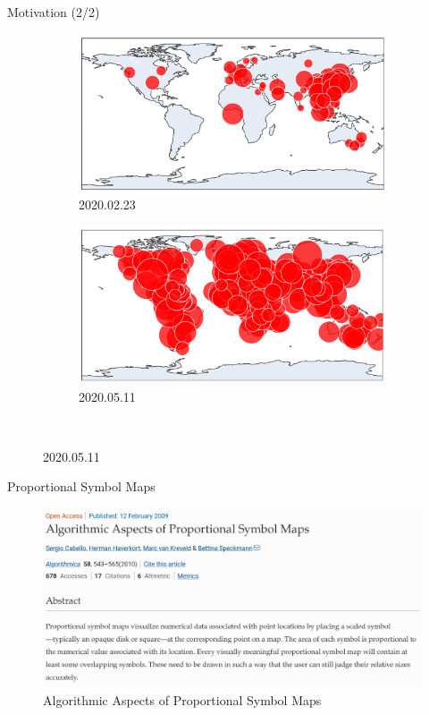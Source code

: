 \documentclass{beamer}
\begin{document}
\begin{frame}{Motivation (2/2)}

  \begin{figure}[!b]
    \centering
    \begin{subfigure}[b]{\linewidth}
      \centering
      \includegraphics[width=0.5\linewidth]{../covid_spread_20200223.png}
      \caption{2020.02.23}
    \end{subfigure}
    \begin{subfigure}[b]{\linewidth}
      \centering
      \includegraphics[width=0.5\linewidth]{../covid_spread_20200511.png}
      \caption{2020.05.11}
    \end{subfigure}\\
  \end{figure}

\end{frame}

\begin{frame}{Proportional Symbol Maps}

  \begin{figure}[!b]
    \centering
      \includegraphics[width=0.9\linewidth]{assets/cabello_haverkort_image.png}
      \caption{Algorithmic Aspects of Proportional Symbol Maps}
  \end{figure}

\end{frame}
\end{document}
